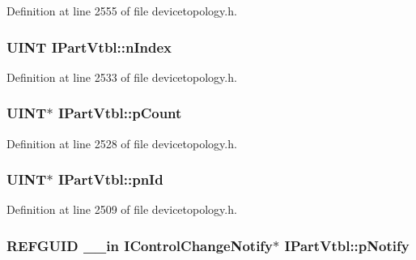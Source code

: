Definition at line 2555 of file devicetopology.\+h.

\subsubsection[{\texorpdfstring{n\+Index}{nIndex}}]{ {\bf U\+I\+NT} I\+Part\+Vtbl\+::n\+Index}\hypertarget{struct_i_part_vtbl_aa1aa2e75942b46a0ae65f2d022c0c4d5}{}\label{struct_i_part_vtbl_aa1aa2e75942b46a0ae65f2d022c0c4d5}


Definition at line 2533 of file devicetopology.\+h.

\subsubsection[{\texorpdfstring{p\+Count}{pCount}}]{ {\bf U\+I\+NT}$\ast$ I\+Part\+Vtbl\+::p\+Count}\hypertarget{struct_i_part_vtbl_a2ccdd4ea006ed0038fca98d2b19914e2}{}\label{struct_i_part_vtbl_a2ccdd4ea006ed0038fca98d2b19914e2}


Definition at line 2528 of file devicetopology.\+h.

\subsubsection[{\texorpdfstring{pn\+Id}{pnId}}]{ {\bf U\+I\+NT}$\ast$ I\+Part\+Vtbl\+::pn\+Id}\hypertarget{struct_i_part_vtbl_a046f3c9703bf56e89f70258825328f4e}{}\label{struct_i_part_vtbl_a046f3c9703bf56e89f70258825328f4e}


Definition at line 2509 of file devicetopology.\+h.

\subsubsection[{\texorpdfstring{p\+Notify}{pNotify}}]{ R\+E\+F\+G\+U\+ID {\bf \+\_\+\+\_\+in} {\bf I\+Control\+Change\+Notify}$\ast$ I\+Part\+Vtbl\+::p\+Notify}\hypertarget{struct_i_part_vtbl_ae81a462fd68f1c13d632c649052d998a}{}\label{struct_i_part_vtbl_ae81a462fd68f1c13d632c649052d998a}


